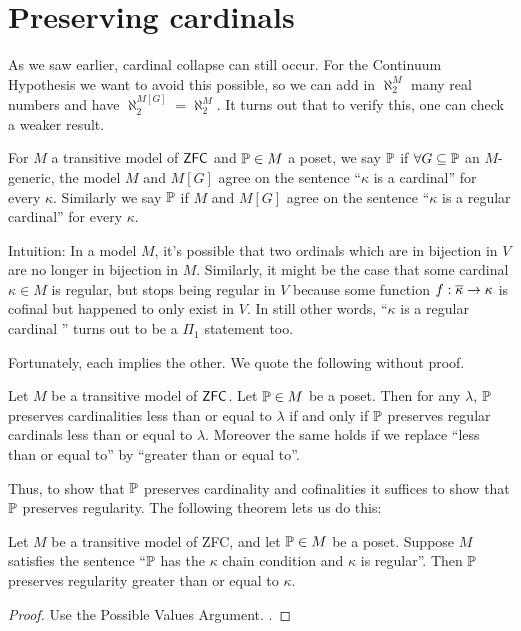 \section{Preserving cardinals}
As we saw earlier, cardinal collapse can still occur.
For the Continuum Hypothesis we want to avoid this possible,
so we can add in $\aleph_2^M$ many real numbers and have $\aleph_2^{M[G]} = \aleph_2^M$.
It turns out that to verify this, one can check a weaker result.

\begin{definition}
	For $M$ a transitive model of $\mathsf{ZFC}$ and $\mathbb P \in M$ a poset,
	we say $\mathbb P$  if
	$\forall G \subseteq \mathbb P$ an $M$-generic,
	the model $M$ and $M[G]$ agree on the sentence ``$\kappa$ is a cardinal'' for every $\kappa$.
	Similarly we say $\mathbb P$  if $M$ and $M[G]$
	agree on the sentence ``$\kappa$ is a regular cardinal'' for every $\kappa$.
\end{definition}
Intuition:
In a model $M$, it's possible that two ordinals which are in bijection in $V$ are no longer in bijection in $M$.
Similarly, it might be the case that some cardinal $\kappa \in M$ is regular,
but stops being regular in $V$ because some function $f : \overline\kappa \to \kappa$ is cofinal but happened to only exist in $V$.
In still other words, ``$\kappa$ is a regular cardinal '' turns out to be a $\Pi_1$ statement too.

Fortunately, each implies the other.
We quote the following without proof.
\begin{proposition}
	Let $M$ be a transitive model of $\mathsf{ZFC}$.
	Let $\mathbb P \in M$ be a poset.
	Then for any $\lambda$,
		$\mathbb P$ preserves cardinalities less than or equal to $\lambda$
		if and only if $\mathbb P$ preserves regular cardinals less than or equal to $\lambda$.
	Moreover the same holds if we replace ``less than or equal to''
	by ``greater than or equal to''.
\end{proposition}

Thus, to show that $\mathbb P$ preserves cardinality and cofinalities
it suffices to show that $\mathbb P$ preserves regularity.
The following theorem lets us do this:
\begin{theorem}
	Let $M$ be a transitive model of ZFC, and let $\mathbb P \in M$ be a poset.
	Suppose $M$ satisfies the sentence ``$\mathbb P$ has the $\kappa$ chain condition and $\kappa$ is regular''.
	Then $\mathbb P$ preserves regularity greater than or equal to $\kappa$.
\end{theorem}
\begin{proof}
	Use the Possible Values Argument.
	.
\end{proof}


